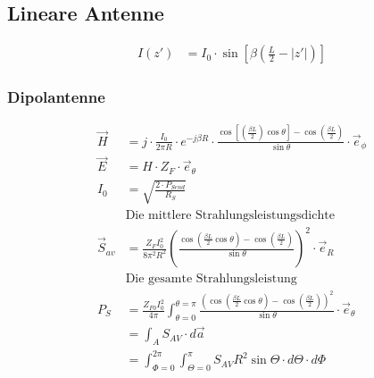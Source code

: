 \subsection{Lineare Antenne}
\begin{align*}
    I(z') & = I_0\cdot\sin\left[\beta\left(\frac{L}{2}-|z'|\right)\right]
\end{align*}

\subsubsection{Dipolantenne}
\begin{align*}
    \vec{H}      & = j\cdot\frac{I_0}{2\pi R}\cdot e^{-j\beta R}\cdot\frac{\cos\left[\left(\frac{\beta L}{2}\right)\cos\theta\right]-\cos\left(\frac{\beta L}{2}\right)}{\sin\theta}\cdot\vec{e}_\phi         \\
    \vec{E}      & = H\cdot Z_F\cdot\vec{e}_\theta                                                                                                                                                            \\
    I_0          & = \sqrt{\frac{2\cdot P_{Send}}{R_S}}                                                                                                                                                       \\
                 & \text{Die mittlere Strahlungsleistungsdichte}                                                                                                                                              \\
    \vec{S}_{av} & = \frac{Z_FI_0^2}{8\pi^2 R^2}\left(\frac{\cos\left(\frac{\beta L}{2}\cos\theta\right)-\cos\left(\frac{\beta L}{2}\right)}{\sin\theta}\right)^2\cdot\vec{e}_R                               \\
                 & \text{Die gesamte Strahlungsleistung}                                                                                                                                                      \\
    P_S          & = \frac{Z_{F0}I_0^2}{4\pi}\int^{\theta=\pi}_{\theta=0}\frac{\left(\cos\left(\frac{\beta L}{2}\cos\theta\right)-\cos\left(\frac{\beta L}{2}\right)\right)^2}{\sin\theta}\cdot\vec{e}_\theta \\
                 & = \int_A S_{AV}\cdot d\vec{a}                                                                                                                                                              \\
                 & = \int^{2\pi}_{\Phi = 0}\int^{\pi}_{\Theta = 0} S_{AV} R^2 \sin\Theta \cdot d\Theta \cdot d\Phi
\end{align*}


